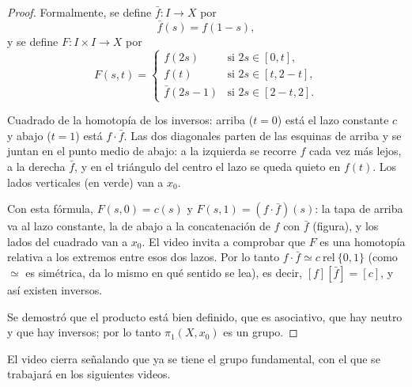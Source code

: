 \documentclass[11pt]{article}
\begin{document}
\begin{proof}
Formalmente, se define $\bar f\colon I\to X$ por
\[
  \bar f(s)=f(1-s),
\]
y se define $F\colon I\times I\to X$ por
\[
  F(s,t)=
  \begin{cases}
    f(2s) & \text{si } 2s\in[0,t],\\[2pt]
    f(t) & \text{si } 2s\in[t,2-t],\\[2pt]
    \bar f(2s-1) & \text{si } 2s\in[2-t,2].
  \end{cases}
\]
\begin{center}
\par\smallskip
\begin{minipage}{0.9\textwidth}\small\centering
Cuadrado de la homotopía de los inversos: arriba ($t=0$) está el lazo constante $c$ y abajo ($t=1$) está $f\cdot\bar f$. Las dos diagonales parten de las esquinas de arriba y se juntan en el punto medio de abajo: a la izquierda se recorre $f$ cada vez más lejos, a la derecha $\bar f$, y en el triángulo del centro el lazo se queda quieto en $f(t)$. Los lados verticales (en verde) van a $x_0$.
\end{minipage}
\end{center}

Con esta fórmula, $F(s,0)=c(s)$ y $F(s,1)=(f\cdot\bar f)(s)$: la tapa de arriba va al lazo constante, la de abajo a la concatenación de $f$ con $\bar f$ (figura), y los lados del cuadrado van a $x_0$. El video invita a comprobar que $F$ es una homotopía relativa a los extremos entre esos dos lazos. Por lo tanto $f\cdot\bar f\simeq c\ \mathrm{rel}\ \{0,1\}$ (como $\simeq$ es simétrica, da lo mismo en qué sentido se lea), es decir, $[f][\bar f]=[c]$, y así existen inversos.

\medskip
Se demostró que el producto está bien definido, que es asociativo, que hay neutro y que hay inversos; por lo tanto $\pi_1(X,x_0)$ es un grupo.
\end{proof}

El video cierra señalando que ya se tiene el grupo fundamental, con el que se trabajará en los siguientes videos.

\begin{erratas}
\end{erratas}
\end{document}
